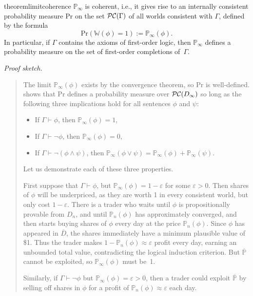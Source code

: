\documentclass[authordate,onecolumn,noenvironments]{miri-tech-article}
\numberwithin{equation}{subsection}
\newenvironment{sketch}[1][]{\noindent\emph{Proof sketch.}\proofin{#1}\begin{quote}}{\end{quote}}
\newcommand{\seq}[1]{{\overline{#1}}}
\newcommand{\nn}{n}
\newcommand{\lic}{logical induction criterion}
\newcommand{\rparenthetical}[1]{\hfill\upshape{{\small (#1)}}} %
\newcommand{\proofin}[1]{\rparenthetical{Proof in:~#1.}}
\newcommand{\Bayesian}{\mathrm{Pr}}
\newcommand{\BelState}{\mathbb{P}}
\newcommand{\pt}{\BelState}
\newcommand{\MP}{\seq{\pt}}
\newcommand{\dt}{D}
\newcommand{\DP}{\seq{\dt}}
\newcommand{\pcworlds}{\mathcal{P\-C}}
\newcommand{\cworlds}{\mathcal{P\-C}} %
\newcommand{\World}{\mathbb{W}}
\newcommand{\Theory}{\Gamma}
\begin{document}
\begin{restatable}{theorem}{limitcoherence}\label{thm:lc}
  $\pt_\infty$ is coherent, i.e., it gives rise to an internally consistent probability measure $\Bayesian$ on the set $\cworlds(\Theory)$ of all worlds consistent with $\Theory$, defined by the formula \[\Bayesian(\World(\phi)=1):=\pt_\infty(\phi).\]
  In particular, if $\Theory$ contains the axioms of first-order logic, then $\pt_\infty$ defines a probability measure on the set of first-order completions of~$\Theory$.
\end{restatable}
\begin{sketch}[\ref{sec:limitcoherence} or~\ref{app:lc}]
  The limit $\pt_\infty(\phi)$ exists by the convergence theorem, so $\Bayesian$ is well-defined. \citet{Gaifman:1964} shows that $\Bayesian$ defines a probability measure over $\pcworlds(\dt_\infty)$ so long as the following three implications hold for all sentences $\phi$ and $\psi$:
  \begin{itemize}
    \item If $\Theory \vdash \phi$, then $\pt_\infty(\phi) = 1$,
    \item If $\Theory \vdash \lnot \phi$, then $\pt_\infty(\phi) = 0$,
    \item If $\Theory \vdash \lnot(\phi \land \psi)$, then $\pt_\infty(\phi \lor \psi) = \pt_\infty(\phi) + \pt_\infty(\psi)$.
  \end{itemize}
  Let us demonstrate each of these three properties.

  First suppose that $\Theory \vdash \phi$, but $\pt_\infty(\phi) = 1-\varepsilon$ for some $\varepsilon>0$. Then shares of $\phi$ will be underpriced, as they are worth 1 in every consistent world, but only cost $1-\varepsilon$. There is a trader who waits until $\phi$ is propositionally provable from $\dt_\nn$, and until $\pt_\nn(\phi)$ has approximately converged, and then starts buying shares of $\phi$ every day at the price $\pt_\nn(\phi)$. Since $\phi$ has appeared in $\DP$, the shares immediately have a minimum plausible value of \$1. Thus the trader makes $1-\pt_\nn(\phi) \approx \varepsilon$ profit every day, earning an unbounded total value, contradicting the \lic{}. But $\MP$ cannot be exploited, so $\pt_\infty(\phi)$ must be~1.

  Similarly, if $\Theory \vdash \lnot\phi$ but $\pt_\infty(\phi) = \varepsilon>0$, then a trader could exploit $\MP$ by selling off shares in $\phi$ for a profit of $\pt_\nn(\phi)\approx \varepsilon$ each day.


\end{sketch}
\end{document}
